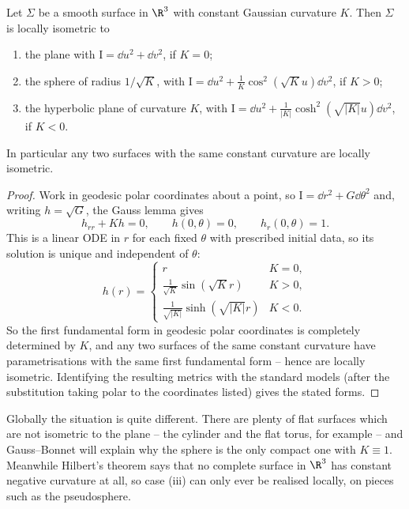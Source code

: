 \begin{theorem}[Minding]
    Let $\Sigma$ be a smooth surface in $\R^3$ with constant Gaussian curvature $K$. Then $\Sigma$ is locally isometric to
    \begin{enumerate}[label=(\roman*)]
        \item the plane with $\mathrm{I} = \dd u^2 + \dd v^2$, if $K = 0$;
        \item the sphere of radius $1/\sqrt{K}$, with $\mathrm{I} = \dd u^2 + \frac{1}{K}\cos^2\left(\sqrt K u\right)\dd v^2$, if $K > 0$;
        \item the hyperbolic plane of curvature $K$, with $\mathrm{I} = \dd u^2 + \frac{1}{|K|}\cosh^2\left(\sqrt{|K|}u\right)\dd v^2$, if $K < 0$.
    \end{enumerate}
    In particular any two surfaces with the same constant curvature are locally isometric.
\end{theorem}
\begin{proof}
    Work in geodesic polar coordinates about a point, so $\mathrm{I} = \dd r^2 + G\dd\theta^2$ and, writing $h = \sqrt G$, the Gauss lemma gives
    $$
    h_{rr} + Kh = 0, \qquad h(0,\theta) = 0, \qquad h_r(0,\theta) = 1.
    $$
    This is a linear ODE in $r$ for each fixed $\theta$ with prescribed initial data, so its solution is unique and independent of $\theta$:
    $$
    h(r) = \begin{cases} r & K = 0, \\ \frac{1}{\sqrt K}\sin\left(\sqrt K r\right) & K > 0, \\ \frac{1}{\sqrt{|K|}}\sinh\left(\sqrt{|K|}r\right) & K < 0.\end{cases}
    $$
    So the first fundamental form in geodesic polar coordinates is completely determined by $K$, and any two surfaces of the same constant curvature have parametrisations with the same first fundamental form -- hence are locally isometric. Identifying the resulting metrics with the standard models (after the substitution taking polar to the coordinates listed) gives the stated forms.
\end{proof}

\begin{remark}
    Globally the situation is quite different. There are plenty of flat surfaces which are not isometric to the plane -- the cylinder and the flat torus, for example -- and Gauss--Bonnet will explain why the sphere is the only compact one with $K \equiv 1$. Meanwhile Hilbert's theorem says that no complete surface in $\R^3$ has constant negative curvature at all, so case (iii) can only ever be realised locally, on pieces such as the pseudosphere.
\end{remark}

